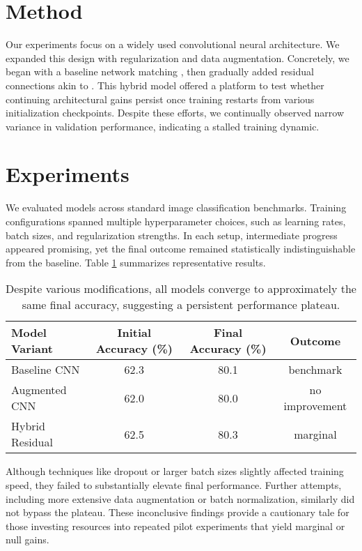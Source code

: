 \documentclass[11pt]{article}
\begin{document}
\vspace{-2mm}
\section{Method}
\vspace{-1mm}
Our experiments focus on a widely used convolutional neural architecture.
We expanded this design with regularization and data augmentation. Concretely,
we began with a baseline network matching \citet{krizhevsky2012imagenet}, then
gradually added residual connections akin to \citet{he2016deep}. This hybrid 
model offered a platform to test whether continuing architectural gains persist
once training restarts from various initialization checkpoints. Despite these efforts,
we continually observed narrow variance in validation performance, indicating a
stalled training dynamic.

\vspace{-2mm}
\section{Experiments}
\vspace{-1mm}
We evaluated models across standard image classification benchmarks. Training
configurations spanned multiple hyperparameter choices, such as learning rates,
batch sizes, and regularization strengths. In each setup, intermediate progress
appeared promising, yet the final outcome remained statistically indistinguishable
from the baseline. Table \ref{tab:mainresults} summarizes representative results.

\begin{table}[h]
\centering
\begin{tabular}{l c c c}
\hline
\textbf{Model Variant} & \textbf{Initial Accuracy (\%)} & \textbf{Final Accuracy (\%)} & \textbf{Outcome}\\
\hline
Baseline CNN & 62.3 & 80.1 & benchmark \\
Augmented CNN & 62.0 & 80.0 & no improvement \\
Hybrid Residual & 62.5 & 80.3 & marginal \\
\hline
\end{tabular}
\caption{Despite various modifications, all models converge to approximately the same final
accuracy, suggesting a persistent performance plateau.}
\label{tab:mainresults}
\end{table}

Although techniques like dropout or larger batch sizes slightly affected training speed,
they failed to substantially elevate final performance. Further attempts, including
more extensive data augmentation or batch normalization, similarly did not bypass
the plateau. These inconclusive findings provide a cautionary tale for those investing
resources into repeated pilot experiments that yield marginal or null gains.
\end{document}
